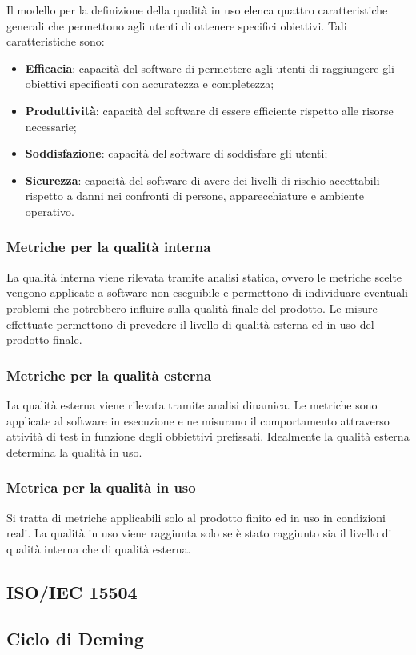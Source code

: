	Il modello per la definizione della qualità in uso elenca quattro caratteristiche generali che permettono agli utenti di ottenere specifici obiettivi. Tali caratteristiche sono:
	\begin{itemize}
		\item{\textbf{Efficacia}: capacità del software di permettere agli utenti di raggiungere gli obiettivi specificati con accuratezza e completezza;}
		\item{\textbf{Produttività}: capacità del software di essere efficiente rispetto alle risorse necessarie;}
		\item{\textbf{Soddisfazione}: capacità del software di soddisfare gli utenti;}
		\item{\textbf{Sicurezza}: capacità del software di avere dei livelli di rischio accettabili rispetto a danni nei confronti di persone, apparecchiature e ambiente operativo.}
	\end{itemize}
	
	\subsubsection{Metriche per la qualità interna}
	La qualità interna viene rilevata tramite analisi statica, ovvero le metriche scelte vengono applicate a software non eseguibile e permettono di individuare eventuali problemi che potrebbero influire sulla qualità finale del prodotto. Le misure effettuate permettono di prevedere il livello di qualità esterna ed in uso del prodotto finale.
	
	\subsubsection{Metriche per la qualità esterna}
	La qualità esterna viene rilevata tramite analisi dinamica. Le metriche sono applicate al software in esecuzione e ne misurano il comportamento attraverso attività di test in funzione degli obbiettivi prefissati.
	Idealmente la qualità esterna determina la qualità in uso.
	
	\subsubsection{Metrica per la qualità in uso}
	Si tratta di metriche applicabili solo al prodotto finito ed in uso in condizioni reali. La qualità in uso viene raggiunta solo se è stato raggiunto sia il livello di qualità interna che di qualità esterna.

\subsection{ISO/IEC 15504}

\subsection{Ciclo di Deming}